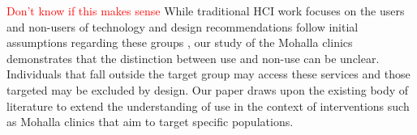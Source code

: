 \textcolor{red}{Don't know if this makes sense} While traditional HCI work focuses on the users and non-users of technology and design recommendations follow initial assumptions regarding these groups \cite{?}, our study of the Mohalla clinics demonstrates that the distinction between use and non-use can be unclear. Individuals that fall outside the target group may access these services \cite{baumer2015usees} and those targeted may be excluded by design. Our paper draws upon the existing body of literature to extend the understanding of use in the context of interventions such as Mohalla clinics that aim to target specific populations.